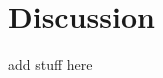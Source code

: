\documentclass{emulateapj}
\begin{document}
\section{Discussion}

add stuff here











\end{document}
